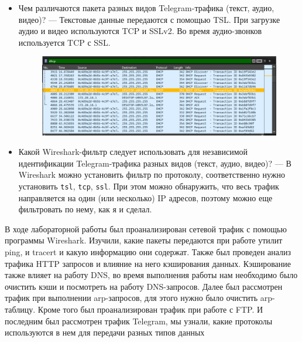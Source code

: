 \begin{itemize}
    \item Чем различаются пакета разных видов Telegram-трафика (текст, аудио, видео)? --- Текстовые данные передаются с помощью TSL. При загрузке аудио и видео используются TCP и SSLv2. Во время аудио-звонков используется TCP с SSL.
        \begin{figure}[H]
            \centering
            \includegraphics[width=1\linewidth]{res/telegram-wireshark.png}
        \end{figure}
    \item Какой Wireshark-фильтр следует использовать для независимой идентификации Telegram-трафика разных видов (текст, аудио, видео)?   
    --- В Wireshark можно установить фильтр по протоколу, соответственно нужно 
    установить \verb|tsl|, \verb|tcp|,  \verb|ssl|. При этом можно обнаружить, что весь трафик направляется на один (или несколько) IP адресов, поэтому можно еще фильтровать по нему, как я и сделал.
\end{itemize}



В ходе лабораторной работы был проанализирован сетевой трафик с помощью 
программы Wireshark. Изучили, какие пакеты передаются при работе утилит ping, и 
tracert и какую информацию они содержат. Также был проведен анализ трафика HTTP запросов и влияние на него кэширования данных. Кэширование также влияет на работу 
DNS, во время выполнения работы нам необходимо было очистить кэши и посмотреть на 
работу DNS-запросов. Далее был рассмотрен трафик при выполнении arp-запросов, для 
этого нужно было очистить arp-таблицу. Кроме того был проанализирован трафик при 
работе с FTP. И последним был рассмотрен трафик Telegram, мы узнали, какие протоколы 
используются в нем для передачи разных типов данных




